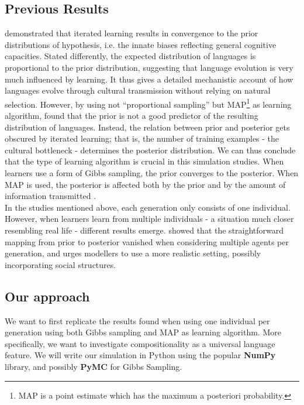 \documentclass[12pt]{scrartcl}
\begin{document}
\subsection*{Previous Results}
\textcite{griffiths2005bayesian} demonstrated that iterated learning results in convergence to the prior distributions of hypothesis, i.e. the innate biases reflecting general cognitive capacities. Stated differently, the expected distribution of languages is proportional to the prior distribution, suggesting that language evolution is very much influenced by learning. It thus gives a detailed mechanistic account of how languages evolve through cultural transmission without relying on natural selection. However, by using not ``proportional sampling'' but MAP\footnote{MAP is a point estimate which has the maximum a posteriori probability.} as learning algorithm, \textcite{kirby2007innateness} found that the prior is not a good predictor of the resulting distribution of languages. Instead, the relation between prior and posterior gets obscured by iterated learning; that is, the number of training examples - the cultural bottleneck - determines the posterior distribution. We can thus conclude that the type of learning algorithm is crucial in this simulation studies. When learners use a form of Gibbs sampling, the prior converges to the posterior. When MAP is used, the posterior is affected both by the prior and by the amount of information transmitted \parencite{griffiths2007language}.\\

In the studies mentioned above, each generation only consists of one individual. However, when learners learn from multiple individuals - a situation much closer resembling real life - different results emerge. \textcite{smith2009iterated} showed that the straightforward mapping from prior to posterior vanished when considering multiple agents per generation, and urges modellers to use a more realistic setting, possibly incorporating social structures.

\subsection*{Our approach}
We want to first replicate the results found when using one individual per generation using both Gibbs sampling and MAP as learning algorithm. More specifically, we want to investigate compositionality as a universal language feature. We will write our simulation in Python using the popular \textbf{NumPy} library, and possibly \textbf{PyMC} for Gibbs Sampling.



\newpage
\printbibliography
\end{document}
